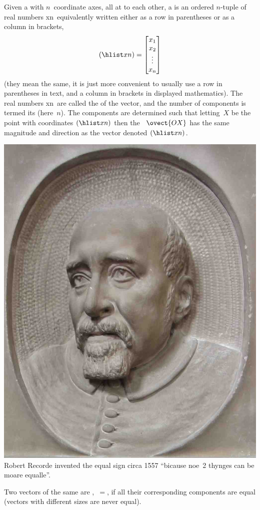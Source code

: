 \begin{definition} \label{def:vecs}
Given a  with \(n\)~coordinate axes, all at  to each other, a  is an ordered \(n\)-tuple of real numbers \hlist xn\ equivalently written either as a row in parentheses or as a column in brackets,
\begin{equation*}
(\hlist xn)=\begin{bmatrix} x_1\\x_2\\\vdots\\x_n \end{bmatrix}
\end{equation*}
(they mean the same, it is just more convenient to usually use a row in parentheses in text, and a column in brackets in displayed mathematics).
The real numbers \hlist xn\ are called the  of the vector, and the number of components is termed its  (here~\(n\)).
The components are determined such that letting~\(X\) be the point with coordinates \((\hlist xn)\) then the ~\(\ovect{OX}\) has the same magnitude and direction as the vector denoted \((\hlist xn)\).
\begin{aside}
\includegraphics[width=\linewidth]{Vectors/RobertRecorde}
Robert Recorde invented the equal sign circa 1557 ``bicause noe~2 thynges can be moare equalle''.  
\end{aside}%
Two vectors of the same  are ,~\(=\), if all their corresponding components are equal (vectors with different sizes are never equal).
\end{definition}

